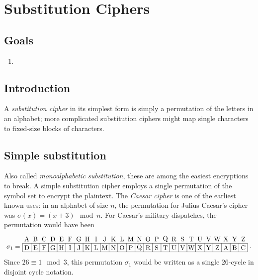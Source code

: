\documentclass[m3380-lec-main.tex]{subfiles}
\begin{document}
\chapter{Substitution Ciphers}

\section*{Goals}
\begin{enumerate}[1.~]\setlength{\itemsep}{0pt}
\item 
\end{enumerate}

\section*{Introduction}
A \emph{substitution cipher} in its simplest form is simply a permutation of the letters in an alphabet; more complicated substitution ciphers might map single characters to fixed-size blocks of characters.

\section{Simple substitution} Also called \emph{monoalphabetic substitution}, these are among the easiest encryptions to break. A simple substitution cipher employs a single permutation of the symbol set to encrypt the plaintext. The \emph{Caesar cipher} is one of the earliest known uses: in an alphabet of size $n$, the permutation for Julius Caesar's cipher was $\sigma(x) = (x+3)\mod n$. For Caesar's military dispatches, the permutation would have been
{\tiny\[\begin{tikzpicture}[scale=12/26]
\draw (0,0.5) node [left] {$\sigma_1 =$} (0,0) grid (26,1) (26,0.5) node [right] {.};
\draw
    \foreach \x/\y in {A/0, B/1, C/2, D/3, E/4, F/5, G/6, H/7, I/8, J/9, K/10, L/11, M/12, N/13, O/14, P/15, Q/16, R/17, S/18, T/19, U/20, V/21, W/22, X/23, Y/24, Z/25}{ (\y+.5, 1.5) node {\x}}
    \foreach \x/\y in {D/0, E/1, F/2, G/3, H/4, I/5, J/6, K/7, L/8, M/9, N/10, O/11, P/12, Q/13, R/14, S/15, T/16, U/17, V/18, W/19, X/20, Y/21, Z/22, A/23, B/24, C/25}{ (\y+.5, 0.5) node {\x}};
\end{tikzpicture}
\]}
Since $26\equiv 1 \mod 3$, this permutation $\sigma_1$ would be written as a single $26$-cycle in disjoint cycle notation.
\end{document}
